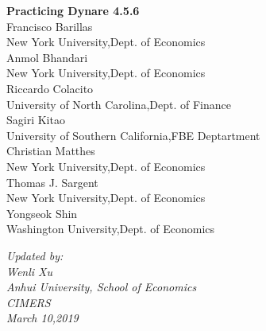\documentclass[a4paper,12pt]{scrartcl} %
\begin{document}




\begin{titlepage}

\thispagestyle{empty}   %



\begin{center}
\vspace*{2.cm}
{\textbf{  \Huge Practicing Dynare 4.5.6}} \\
\vspace*{2cm}
Francisco Barillas\\
New York University,Dept. of Economics\\
\vspace{0.5cm}
Anmol Bhandari\\
New York University,Dept. of Economics\\
\vspace{0.5cm}
Riccardo Colacito\\
University of North Carolina,Dept. of Finance\\
\vspace{0.5cm}
Sagiri Kitao\\
University of Southern California,FBE Deptartment\\
\vspace{0.5cm}
Christian Matthes\\
New York University,Dept. of Economics\\
\vspace{0.5cm}
Thomas J. Sargent\\
New York University,Dept. of Economics\\
\vspace{0.5cm}
Yongseok Shin\\
Washington University,Dept. of Economics
\end{center}


\vfill
\begin{flushright}
   \emph{Updated by:} \\
   \emph{Wenli Xu} \\
   \emph{Anhui University, School of Economics}\\
    \emph{CIMERS}\\
    \emph{March 10,2019}\\
\end{flushright}


\end{titlepage}
\end{document}
